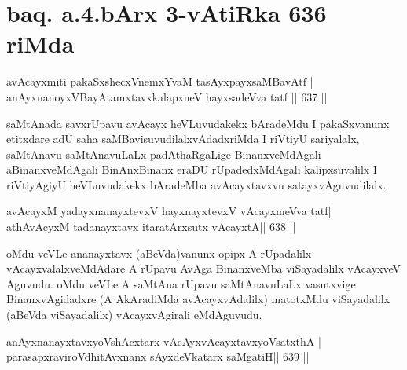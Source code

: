 \section*{baq. a.4.bArx 3-vAtiRka 636 riMda}

\begin{shl}
avAcayxmiti pakaSxshecxVnemxYvaM tasAyxpayxsaMBavAtf | \\
anAyxnanoyxVBayAtamxtavxkalapxneV hayxsadeVva tatf \hfill||  637 ||  
\end{shl}

\begin{artha}
saMtAnada savxrUpavu avAcayx heVLuvudakekx bAradeMdu I pakaSxvanunx etitxdare adU saha saMBavisuvudilalxvAdadxriMda I riVtiyU sariyalalx, saMtAnavu saMtAnavuLaLx padAthaRgaLige BinanxveMdAgali aBinanxveMdAgali BinAnxBinanx eraDU rUpadedxMdAgali kalipxsuvalilx I riVtiyAgiyU heVLuvudakekx bAradeMba avAcayxtavxvu satayxvAguvudilalx.
\end{artha}

\begin{shl}
avAcayxM yadayxnanayxtevxV hayxnayxtevxV vAcayxmeVva tatf\footnotemark[1] | \\
athAvAcyxM tadanayxtavx itaratArxsutx vAcayxtA\footnotemark[2] \hfill ||  638 ||  
\end{shl}

\begin{artha}

oMdu veVLe ananayxtavx (aBeVda)vanunx opipx A rUpadalilx vAcayxvalalxveMdAdare A rUpavu AvAga BinanxveMba viSayadalilx vAcayxveV Aguvudu. oMdu veVLe A saMtAna rUpavu saMtAnavuLaLx vasutxvige BinanxvAgidadxre (A AkAradiMda avAcayxvAdalilx) matotxMdu viSayadalilx (aBeVda viSayadalilx) vAcayxvAgirali eMdAguvudu.
\end{artha}

\begin{shl}
\footnotemark[3]anAyxnanayxtavxyoVshAcxtarx vAcAyxvAcayxtavxyoVsatxthA | \\
parasapxraviroVdhitAvxnanx sAyxdeVkatarx saMgatiH\hfill ||  639 ||  
\end{shl}

